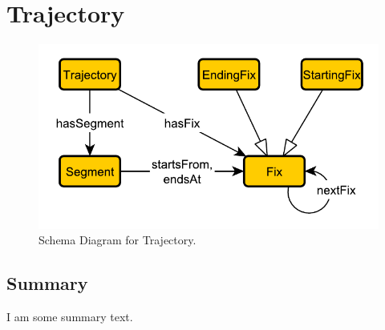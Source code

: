 \section{Trajectory}
\label{sec:Trajectory}
\begin{figure}[h!]
\begin{center}
\includegraphics[width=.8\textwidth]{figures/trajectory}
\end{center}
\caption{Schema Diagram for Trajectory.}
\label{fig:Trajectory}
\end{figure}
\subsection{Summary}
\label{sum:Trajectory}
I am some summary text.

